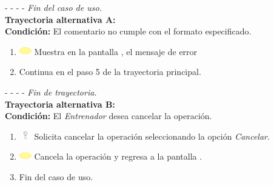 - - - - \textit{Fin del caso de uso.} \\


\textbf{\large{Trayectoria alternativa A:}}\\
\textbf{Condición: } El comentario no cumple con el formato especificado.

\begin{enumerate}
	\item \includegraphics[width=15pt]{./Figuras/iconosCU/herramienta.png} Muestra en la pantalla , el mensaje de error 
	\item Continua en el paso 5 de la trayectoria principal.
\end{enumerate}

- - - - \textit{Fin de trayectoria.} \\

\textbf{\large{Trayectoria alternativa B:}}\\
\textbf{Condición: } El \textit{Entrenador} desea cancelar la operación.

\begin{enumerate}
	\item \includegraphics[width=15pt, height=10pt]{./Figuras/iconosCU/usuario.png} Solicita cancelar la operación seleccionando la opción \textit{Cancelar}.
	\item \includegraphics[width=15pt]{./Figuras/iconosCU/herramienta.png} Cancela la operación y regresa a la pantalla .
	\item Fin del caso de uso.
\end{enumerate}

\clearpage
